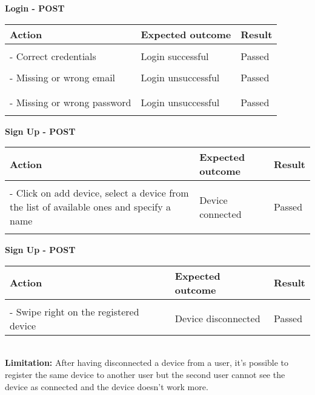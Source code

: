 \textbf{Login - POST}
\begin{center}
	\begin{tabular}{|p{}|p{}|p{}|}
		\hline
		Action & Expected outcome & Result \\
		\hline
		&&\\
		- Correct credentials & Login successful & Passed\\
		\hline
		&&\\
		- Missing or wrong email & Login unsuccessful & Passed\\
		&&\\
		\hline
		&&\\
		- Missing or wrong password & Login unsuccessful & Passed\\
		&&\\
		\hline
	\end{tabular}
\end{center}

\newpage

\textbf{Sign Up - POST}
\begin{center}
	\begin{tabular}{|p{}|p{}|p{}|}
		\hline
		Action & Expected outcome & Result \\
		\hline
		&&\\
		- Click on add device, select a device from the list of available ones and specify a name & Device connected & Passed\\
		&&\\
		\hline
	\end{tabular}
\end{center}

\textbf{Sign Up - POST}
\begin{center}
	\begin{tabular}{|p{}|p{}|p{}|}
		\hline
		Action & Expected outcome & Result \\
		\hline
		&&\\
		- Swipe right on the registered device & Device disconnected & Passed\\
		\hline
	\end{tabular}
\end{center}

\\
\textbf{Limitation:}
After having disconnected a device from a user, it's possible to register the same device to another user but the second user cannot see the device as connected and the device doesn't work more.

